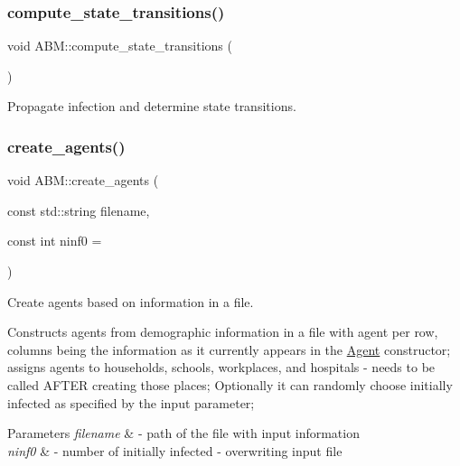 \mbox{\label{classABM_ad1e04b146d0c55ee36449def71bb0e51}} 
\subsubsection{\texorpdfstring{compute\+\_\+state\+\_\+transitions()}{compute\_state\_transitions()}}
{\footnotesize\ttfamily void A\+B\+M\+::compute\+\_\+state\+\_\+transitions (\begin{DoxyParamCaption}{ }\end{DoxyParamCaption})}



Propagate infection and determine state transitions. 

\mbox{\label{classABM_a5ed9bcec2972c5e6967dbec30947c94c}} 
\subsubsection{\texorpdfstring{create\+\_\+agents()}{create\_agents()}}
{\footnotesize\ttfamily void A\+B\+M\+::create\+\_\+agents (\begin{DoxyParamCaption}\item[{const std\+::string}]{filename,  }\item[{const int}]{ninf0 = {} }\end{DoxyParamCaption})}



Create agents based on information in a file. 

Constructs agents from demographic information in a file with agent per row, columns being the information as it currently appears in the \hyperlink{classAgent}{Agent} constructor; assigns agents to households, schools, workplaces, and hospitals -\/ needs to be called A\+F\+T\+ER creating those places; Optionally it can randomly choose initially infected as specified by the input parameter;


\begin{DoxyParams}{Parameters}
{\em filename} & -\/ path of the file with input information \\
\hline
{\em ninf0} & -\/ number of initially infected -\/ overwriting input file \\
\hline
\end{DoxyParams}
\mbox{\label{classABM_a3f0199d0d954cf0b3ecffc8a82c3c958}} 
